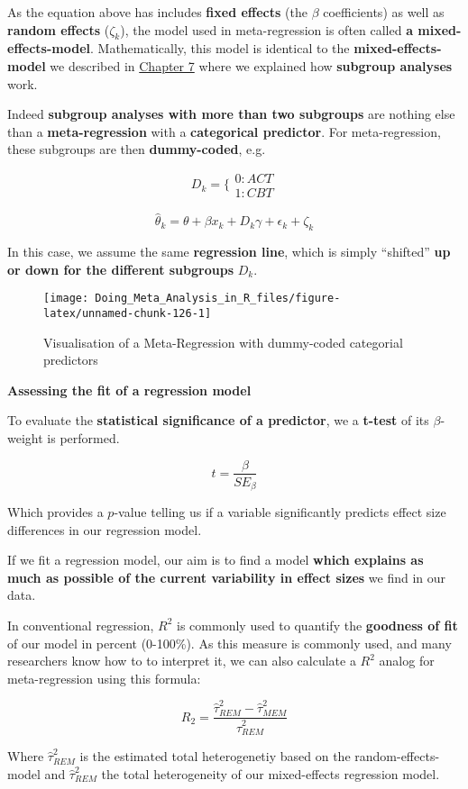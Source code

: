 \documentclass[]{book}
\theoremstyle{definition}
\theoremstyle{definition}
\theoremstyle{definition}
\theoremstyle{remark}
\begin{document}
\begin{rmdinfo}
As the equation above has includes \textbf{fixed effects} (the \(\beta\)
coefficients) as well as \textbf{random effects} (\(\zeta_k\)), the
model used in meta-regression is often called \textbf{a
mixed-effects-model}. Mathematically, this model is identical to the
\textbf{mixed-effects-model} we described in
\protect\hyperlink{subgroup}{Chapter 7} where we explained how
\textbf{subgroup analyses} work.

Indeed \textbf{subgroup analyses with more than two subgroups} are
nothing else than a \textbf{meta-regression} with a \textbf{categorical
predictor}. For meta-regression, these subgroups are then
\textbf{dummy-coded}, e.g.

\[ D_k =  \{\begin{array}{c}0:ACT \\1:CBT \end{array}\]

\[\hat \theta_k = \theta + \beta x_{k} + D_k \gamma + \epsilon_k + \zeta_k\]

In this case, we assume the same \textbf{regression line}, which is
simply ``shifted'' \textbf{up or down for the different subgroups}
\(D_k\).
\end{rmdinfo}

\begin{figure}

{\centering \texttt{[image: Doing\_Meta\_Analysis\_in\_R\_files/figure-latex/unnamed-chunk-126-1]} 

}

\caption{Visualisation of a Meta-Regression with dummy-coded categorial predictors}\label{fig:unnamed-chunk-126}
\end{figure}

\begin{rmdinfo}
\textbf{Assessing the fit of a regression model}

To evaluate the \textbf{statistical significance of a predictor}, we a
\textbf{t-test} of its \(\beta\)-weight is performed.

\[ t=\frac{\beta}{SE_{\beta}}\]

Which provides a \(p\)-value telling us if a variable significantly
predicts effect size differences in our regression model.

If we fit a regression model, our aim is to find a model \textbf{which
explains as much as possible of the current variability in effect sizes}
we find in our data.

In conventional regression, \(R^2\) is commonly used to quantify the
\textbf{goodness of fit} of our model in percent (0-100\%). As this
measure is commonly used, and many researchers know how to to interpret
it, we can also calculate a \(R^2\) analog for meta-regression using
this formula:

\[R_2=\frac{\hat\tau^2_{REM}-\hat\tau^2_{MEM}}{\hat\tau^2_{REM}}\]

Where \(\hat\tau^2_{REM}\) is the estimated total heterogenetiy based on
the random-effects-model and \(\hat\tau^2_{REM}\) the total
heterogeneity of our mixed-effects regression model.
\end{rmdinfo}
\end{document}
